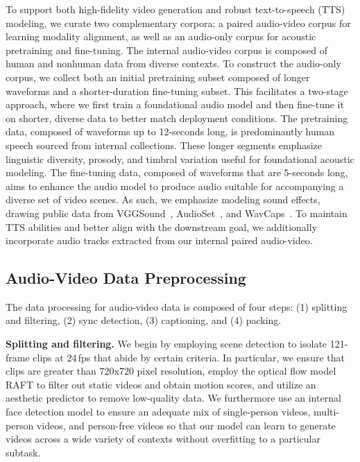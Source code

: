\documentclass{article} %
\begin{document}
To support both high-fidelity video generation and robust text-to-speech (TTS) modeling, we curate two complementary corpora: a paired audio-video corpus for learning modality alignment, as well as an audio-only corpus for acoustic pretraining and fine-tuning. The internal audio-video corpus is composed of human and nonhuman data from diverse contexts. To construct the audio-only corpus, we collect both an initial pretraining subset composed of longer waveforms and a shorter-duration fine-tuning subset. This facilitates a two-stage approach, where we first train a foundational audio model and then fine-tune it on shorter, diverse data to better match deployment conditions. The pretraining data, composed of waveforms up to 12-seconds long, is predominantly human speech sourced from internal collections. These longer segments emphasize linguistic diversity, prosody, and timbral variation useful for foundational acoustic modeling. The fine-tuning data, composed of waveforms that are 5-seconds long, aims to enhance the audio model to produce audio suitable for accompanying a diverse set of video scenes. As such, we emphasize modeling sound effects, drawing public data from VGGSound~\citep{chen2020vggsound}, AudioSet~\citep{gemmeke2017audio}, and WavCaps~\cite{mei2024wavcaps}. To maintain TTS abilities and better align with the downstream goal, we additionally incorporate audio tracks extracted from our internal paired audio-video.

\subsection{Audio-Video Data Preprocessing}

The data processing for audio-video data is composed of four steps: (1) splitting and filtering, (2) sync detection, (3) captioning, and (4) packing. 

\textbf{Splitting and filtering. } We begin by employing scene detection to isolate 121-frame clips at 24\,fps that abide by certain criteria. In particular, we ensure that clips are greater than 720x720 pixel resolution, employ the optical flow model RAFT \citep{teed2020raft} to filter out static videos and obtain motion scores, and utilize an aesthetic predictor \citep{improved-laion-aesthetic} to remove low-quality data. We furthermore use an internal face detection model to ensure an adequate mix of single-person videos, multi-person videos, and person-free videos so that our model can learn to generate videos across a wide variety of contexts without overfitting to a particular subtask. 
\end{document}

